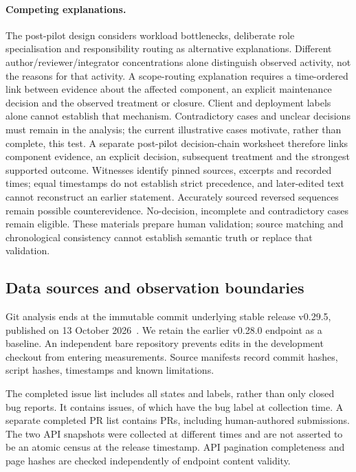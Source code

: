 \documentclass[11pt]{article}
\begin{document}
\paragraph{Competing explanations.}
The post-pilot design considers workload bottlenecks, deliberate role
specialisation and responsibility routing as alternative explanations.
Different author/reviewer/integrator concentrations alone distinguish observed
activity, not the reasons for that activity. A scope-routing explanation requires
a time-ordered link between evidence about the affected component, an explicit
maintenance decision and the observed treatment or closure. Client and deployment
labels alone cannot establish that mechanism. Contradictory cases and unclear
decisions must remain in the analysis; the current illustrative cases motivate,
rather than complete, this test.
A separate post-pilot decision-chain worksheet therefore links component evidence,
an explicit decision, subsequent treatment and the strongest supported outcome.
Witnesses identify pinned sources, excerpts and recorded times; equal timestamps
do not establish strict precedence, and later-edited text cannot reconstruct an
earlier statement. Accurately sourced reversed sequences remain possible
counterevidence. No-decision, incomplete and contradictory cases remain eligible.
These materials prepare human validation; source matching and chronological
consistency cannot establish semantic truth or replace that validation.

\subsection{Data sources and observation boundaries}
Git analysis ends at the immutable commit underlying stable release v0.29.5,
published on 13 October 2026~\cite{headscale_release}. We retain the earlier
v0.28.0 endpoint as a baseline. An independent bare repository prevents edits
in the development checkout from entering measurements. Source manifests record
commit hashes, script hashes, timestamps and known limitations.

The completed issue list includes all states and labels, rather than only closed
bug reports. It contains \IssueCount{} issues, of which \BugLabelCount{} have
the bug label at collection time. A separate completed PR list contains
\PRCount{} PRs, including \HumanPRCount{} human-authored submissions. The
two API snapshots were collected at different times and are not asserted to be
an atomic census at the release timestamp. API pagination completeness and
page hashes are checked independently of endpoint content validity.
\end{document}
